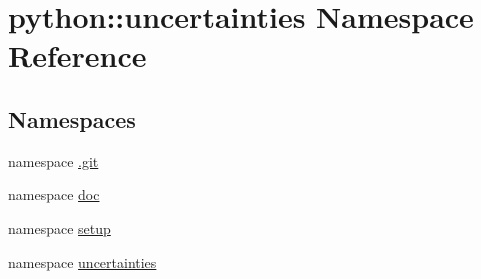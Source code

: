 \hypertarget{namespacepython_1_1uncertainties}{
\section{python::uncertainties Namespace Reference}
\label{namespacepython_1_1uncertainties}
}
\subsection*{Namespaces}
\begin{DoxyCompactItemize}
\item 
namespace \hyperlink{namespacepython_1_1uncertainties_1_1_8git}{.git}
\item 
namespace \hyperlink{namespacepython_1_1uncertainties_1_1doc}{doc}
\item 
namespace \hyperlink{namespacepython_1_1uncertainties_1_1setup}{setup}
\item 
namespace \hyperlink{namespacepython_1_1uncertainties_1_1uncertainties}{uncertainties}
\end{DoxyCompactItemize}
